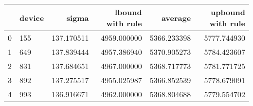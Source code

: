\begin{tabular}{llrrrr}
\toprule
{} & device &       sigma &  lbound with rule &      average &  upbound with rule \\
\midrule
0 &    155 &  137.170511 &       4959.000000 &  5366.233398 &        5777.744930 \\
1 &    649 &  137.839444 &       4957.386940 &  5370.905273 &        5784.423607 \\
2 &    831 &  137.684651 &       4967.000000 &  5368.717773 &        5781.771725 \\
3 &    892 &  137.275517 &       4955.025987 &  5366.852539 &        5778.679091 \\
4 &    993 &  136.916671 &       4962.000000 &  5368.804688 &        5779.554702 \\
\bottomrule
\end{tabular}

